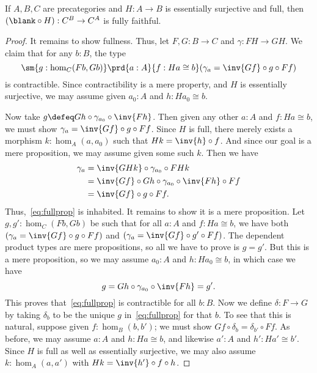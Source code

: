 \begin{lem}\label{ct:esofull-precomp-ff}
  If $A,B,C$ are precategories and $H:A\to B$ is essentially surjective and full, then $(\blank\circ H):C^B \to C^A$ is fully faithful.
\end{lem}
\begin{proof}
  It remains to show fullness.
  Thus, let $F,G:B\to C$ and $\gamma:FH \to GH$.
  We claim that for any $b:B$, the type
  \begin{equation}\label{eq:fullprop}
    \sm{g:\hom_C(Fb,Gb)} \prd{a:A}{f:Ha\cong b} (\gamma_a =  \inv{Gf}\circ g\circ Ff)
  \end{equation}
  is contractible.
  Since contractibility is a mere property, and $H$ is essentially surjective, we may assume given $a_0:A$ and $h:Ha_0\cong b$.

  Now take $g\defeq Gh \circ \gamma_{a_0} \circ \inv{Fh}$.
  Then given any other $a:A$ and $f:Ha\cong b$, we must show $\gamma_a =  \inv{Gf}\circ g\circ Ff$.
  Since $H$ is full, there merely exists a morphism $k:\hom_A(a,a_0)$ such that $Hk = \inv{h}\circ f$.
  And since our goal is a mere proposition, we may assume given some such $k$.
  Then we have
  \begin{align*}
    \gamma_a &= \inv{GHk}\circ \gamma_{a_0} \circ FHk\\
    &= \inv{Gf} \circ Gh \circ \gamma_{a_0} \circ \inv{Fh} \circ Ff\\
    &= \inv{Gf}\circ g\circ Ff.
  \end{align*}
  Thus,~\eqref{eq:fullprop} is inhabited.
  It remains to show it is a mere proposition.
  Let $g,g':\hom_C(Fb, Gb)$ be such that for all $a:A$ and $f:Ha\cong b$, we have both $(\gamma_a =  \inv{Gf}\circ g\circ Ff)$ and $(\gamma_a =  \inv{Gf}\circ g'\circ Ff)$.
  The dependent product types are mere propositions, so all we have to prove is $g=g'$.
  But this is a mere proposition, so we may assume $a_0:A$ and $h:Ha_0\cong b$, in which case we have
  \[ g = Gh \circ \gamma_{a_0} \circ \inv{Fh} = g'.\]
  This proves that~\eqref{eq:fullprop} is contractible for all $b:B$.
  Now we define $\delta:F\to G$ by taking $\delta_b$ to be the unique $g$ in~\eqref{eq:fullprop} for that $b$.
  To see that this is natural, suppose given $f:\hom_B(b,b')$; we must show $Gf \circ \delta_b = \delta_{b'}\circ Ff$.
  As before, we may assume $a:A$ and $h:Ha\cong b$, and likewise $a':A$ and $h':Ha'\cong b'$.
  Since $H$ is full as well as essentially surjective, we may also assume $k:\hom_A(a,a')$ with $Hk = \inv{h'}\circ f\circ h$.


\end{proof}
